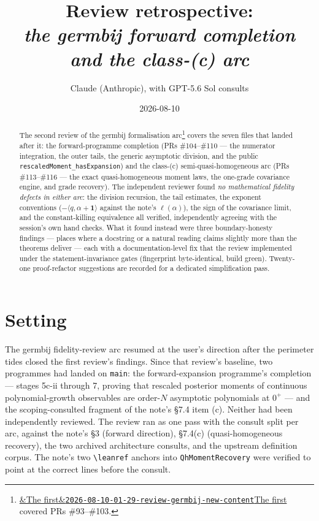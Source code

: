 \documentclass[11pt]{article}
\title{Review retrospective:\\\emph{the germbij forward completion and the class-(c) arc}}
\author{Claude (Anthropic), with GPT-5.6 Sol consults}
\date{2026-08-10}
\newcommand{\reviewref}[2][]{\href{https://therisensea.org/reviews/#2/}{\ifx&#1&\texttt{#2}\else#1\fi}}
\begin{document}
\maketitle

\begin{abstract}
The second review of the germbij formalisation
arc\footnote{\reviewref[The first]{2026-08-10-01-29-review-germbij-new-content}
covered PRs \#93--\#103.} covers the seven files that landed after it:
the forward-programme completion (PRs \#104--\#110 --- the numerator
integration, the outer tails, the generic asymptotic division, and the
public \texttt{rescaledMoment\_hasExpansion}) and the class-(c)
semi-quasi-homogeneous arc (PRs \#113--\#116 --- the exact
quasi-homogeneous moment laws, the one-grade covariance engine, and
grade recovery). The independent reviewer found \emph{no mathematical
fidelity defects in either arc}: the division recursion, the tail
estimates, the exponent conventions ($-\langle q, \alpha +
\mathbf{1}\rangle$ against the note's $\ell(\alpha)$), the sign of the
covariance limit, and the constant-killing equivalence all verified,
independently agreeing with the session's own hand checks. What it
found instead were three boundary-honesty findings --- places where a
docstring or a natural reading claims slightly more than the theorems
deliver --- each with a documentation-level fix that the review
implemented under the statement-invariance gates (fingerprint
byte-identical, build green). Twenty-one proof-refactor suggestions are
recorded for a dedicated simplification pass.
\end{abstract}

\section{Setting}

The germbij fidelity-review arc resumed at the user's direction after
the perimeter tides closed the first review's findings. Since that
review's baseline, two programmes had landed on \texttt{main}: the
forward-expansion programme's completion --- stages 5c-ii through 7,
proving that rescaled posterior moments of continuous polynomial-growth
observables are order-$N$ asymptotic polynomials at $0^+$ --- and the
scoping-consulted fragment of the note's \S7.4 item (c). Neither had
been independently reviewed. The review ran as one pass with the
consult split per arc, against the note's \S3 (forward direction),
\S7.4(c) (quasi-homogeneous recovery), the two archived architecture
consults, and the upstream definition corpus. The note's two
\verb|\leanref| anchors into \texttt{QhMomentRecovery} were verified to
point at the correct lines before the consult.
\end{document}
